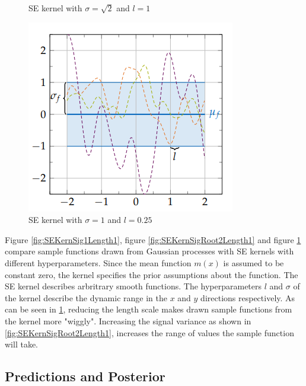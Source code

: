 \documentclass[12pt,a4paper]{report}
\theoremstyle{definition}
\begin{document}
\begin{figure}[H]
\begin{minipage}[t]{0.3\textwidth}
	    	\caption{SE kernel with $\sigma=\sqrt{2}$ and $l=1$ \citep{Kaiser2017}}
	    	\label{fig:SEKernSigRoot2Length1}
	\end{minipage}
	\hfill
	\begin{minipage}[t]{0.3\textwidth}
	 	\includegraphics[width=\linewidth]{RBF_sigma_1_lengthscale_025.png}
	    	\caption{SE kernel with $\sigma=1$ and $l=0.25$ \citep{Kaiser2017}}
	    	\label{fig:SEKernSig1Length0.25}
	\end{minipage}
\end{figure}

Figure \ref{fig:SEKernSig1Length1}, figure \ref{fig:SEKernSigRoot2Length1} and figure \ref{fig:SEKernSig1Length0.25} compare sample functions drawn from Gaussian processes with SE kernels with different hyperparameters. 
Since the mean function $m(x)$ is assumed to be constant zero, the kernel specifies the prior assumptions about the function.
The SE kernel describes arbritrary smooth functions. The hyperparameters $l$ and $\sigma$ of the kernel describe the dynamic range in the $x$ and $y$ directions respectively.
As can be seen in \ref{fig:SEKernSig1Length0.25}, reducing the length scale makes drawn sample functions from the kernel more "wiggly".
Increasing the signal variance as shown in \ref{fig:SEKernSigRoot2Length1}, increases the range of values the sample function will take.

\subsection{Predictions and Posterior}
\end{document}
